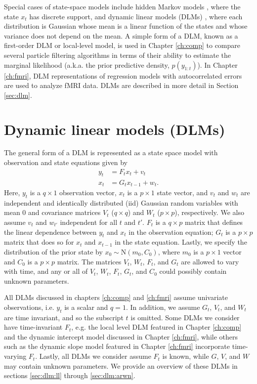 Special cases of state-space models include hidden Markov models \citep{cappe:2005:inference}, where the state $x_t$ has discrete support, and dynamic linear models (DLMs) \citep{West:Harr:baye:1997, petris:camp:2009:dynamic}, where each distribution is Gaussian whose mean is a linear function of the states and whose variance does not depend on the mean. A simple form of a DLM, known as a first-order DLM or local-level model, is used in Chapter \ref{ch:comp} to compare several particle filtering algorithms in terms of their ability to estimate the marginal likelihood (a.k.a. the prior predictive density, $p(y_{1:t})$). In Chapter \ref{ch:fmri}, DLM representations of regression models with autocorrelated errors are used to analyze fMRI data. DLMs are described in more detail in Section \ref{sec:dlm}.

\section{Dynamic linear models (DLMs) \label{sec:dlm}}

The general form of a DLM is represented as a state space model with observation and state equations given by
\begin{align}
y_t &= F_tx_t + v_t \label{eqn:dlm:obs} \\
x_t &= G_tx_{t-1} + w_t. \label{eqn:dlm:state}
\end{align}
Here, $y_t$ is a $q \times 1$ observation vector, $x_t$ is a $p \times 1$ state vector, and $v_t$ and $w_t$ are independent and identically distributed (iid) Gaussian random variables with mean 0 and covariance matrices $V_t$ ($q \times q$) and $W_t$ ($p \times p$), respectively. We also assume $v_t$ and $w_{t'}$ independent for all $t$ and $t'$. $F_t$ is a $q \times p$ matrix that defines the linear dependence between $y_t$ and $x_t$ in the observation equation; $G_t$ is a $p \times p$ matrix that does so for $x_t$ and $x_{t-1}$ in the state equation. Lastly, we specify the distribution of the prior state by $x_0 \sim \mbox{N}(m_0, C_0)$, where $m_0$ is a $p \times 1$ vector and $C_0$ is a $p \times p$ matrix. The matrices $V_t$, $W_t$, $F_t$, and $G_t$ are allowed to vary with time, and any or all of $V_t$, $W_t$, $F_t$, $G_t$, and $C_0$ could possibly contain unknown parameters.

All DLMs discussed in chapters \ref{ch:comp} and \ref{ch:fmri} assume univariate observations, i.e. $y_t$ is a scalar and $q = 1$. In addition, we assume $G_t$, $V_t$, and $W_t$ are time invariant, and so the subscript $t$ is omitted. Some DLMs we consider have time-invariant $F_t$, e.g. the local level DLM featured in Chapter \ref{ch:comp} and the dynamic intercept model discussed in Chapter \ref{ch:fmri}, while others such as the dynamic slope model featured in Chapter \ref{ch:fmri} incorporate time-varying $F_t$. Lastly, all DLMs we consider assume $F_t$ is known, while $G$, $V$, and $W$ may contain unknown parameters. We provide an overview of these DLMs in sections \ref{sec:dlm:ll} through \ref{sec:dlm:arwn}.

